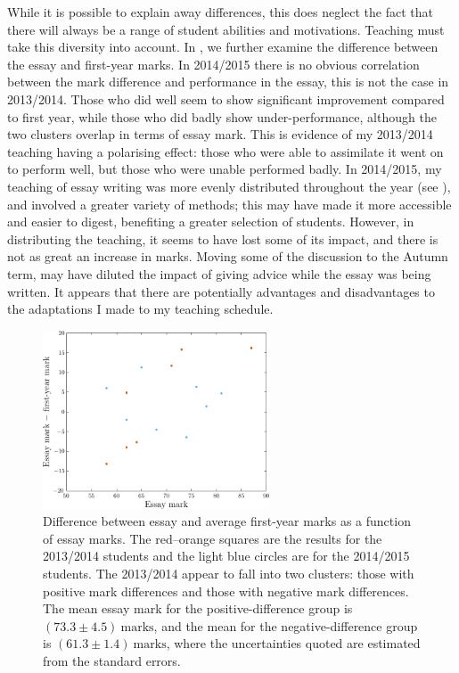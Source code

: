 While it is possible to explain away differences, this does neglect the fact that there will always be a range of student abilities and motivations. Teaching must take this diversity into account. In , we further examine the difference between the essay and first-year marks. In 2014/2015 there is no obvious correlation between the mark difference and performance in the essay, this is not the case in 2013/2014. Those who did well seem to show significant improvement compared to first year, while those who did badly show under-performance, although the two clusters overlap in terms of essay mark. This is evidence of my 2013/2014 teaching having a polarising effect: those who were able to assimilate it went on to perform well, but those who were unable performed badly. In 2014/2015, my teaching of essay writing was more evenly distributed throughout the year (see ), and involved a greater variety of methods; this may have made it more accessible and easier to digest, benefiting a greater selection of students. However, in distributing the teaching, it seems to have lost some of its impact, and there is not as great an increase in marks. Moving some of the discussion to the Autumn term, may have diluted the impact of giving advice while the essay was being written. It appears that there are potentially advantages and disadvantages to the adaptations I made to my teaching schedule.
\begin{figure}
  \centering
   \includegraphics[width=0.6\textwidth]{./figs/Fig_mark_mark_diff}
\caption{Difference between essay and average first-year marks as a function of essay marks. The red--orange squares are the results for the 2013/2014 students and the light blue circles are for the 2014/2015 students. The 2013/2014 appear to fall into two clusters: those with positive mark differences and those with negative mark differences. The mean essay mark for the positive-difference group is $(73.3\pm4.5)~\mathrm{marks}$, and the mean for the negative-difference group is $(61.3\pm1.4)~\mathrm{marks}$, where the uncertainties quoted are estimated from the standard errors.}
  \label{fig:mark-mark-diff}
\end{figure}

